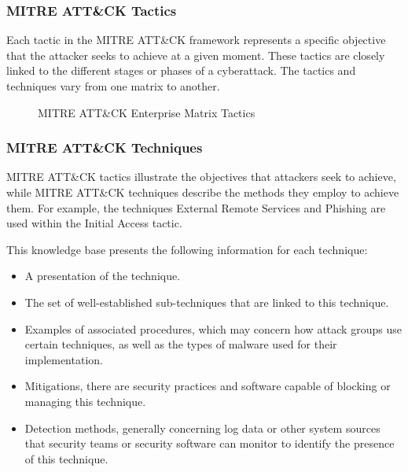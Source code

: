 \subsubsection{MITRE ATT\&CK Tactics}

Each tactic in the MITRE ATT\&CK framework represents a specific objective that the attacker seeks to achieve at a given moment. These tactics are closely linked to the different stages or phases of a cyberattack. The tactics and techniques vary from one matrix to another.

\begin{figure}[H]
\centering
{}
\caption{MITRE ATT\&CK Enterprise Matrix Tactics}
\label{fig:mitre-tactics}
\end{figure}

\subsubsection{MITRE ATT\&CK Techniques}

MITRE ATT\&CK tactics illustrate the objectives that attackers seek to achieve, while MITRE ATT\&CK techniques describe the methods they employ to achieve them. For example, the techniques External Remote Services and Phishing are used within the Initial Access tactic.

This knowledge base presents the following information for each technique:

\begin{itemize}
    \item A presentation of the technique.
    \item The set of well-established sub-techniques that are linked to this technique.
    \item Examples of associated procedures, which may concern how attack groups use certain techniques, as well as the types of malware used for their implementation.
    \item Mitigations, there are security practices and software capable of blocking or managing this technique.
    \item Detection methods, generally concerning log data or other system sources that security teams or security software can monitor to identify the presence of this technique.
\end{itemize}

